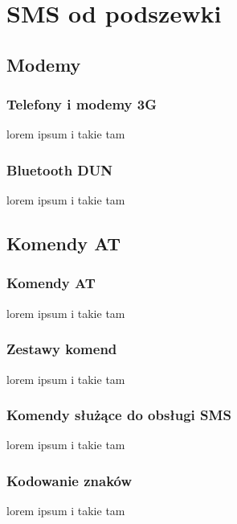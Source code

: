 \documentclass[xcolor=table]{beamer}
\begin{document}
\section{SMS od podszewki}

\subsection{Modemy}
\begin{frame}
  \frametitle{Telefony i modemy 3G}

lorem ipsum i takie tam

\end{frame}

\begin{frame}
  \frametitle{Bluetooth DUN}

lorem ipsum i takie tam

\end{frame}
\subsection{Komendy AT}
\begin{frame}
  \frametitle{Komendy AT}

lorem ipsum i takie tam

\end{frame}

\begin{frame}
  \frametitle{Zestawy komend}

lorem ipsum i takie tam

\end{frame}
\begin{frame}
  \frametitle{Komendy służące do obsługi SMS}

lorem ipsum i takie tam

\end{frame}
\begin{frame}
  \frametitle{Kodowanie znaków}

lorem ipsum i takie tam

\end{frame}
\end{document}
